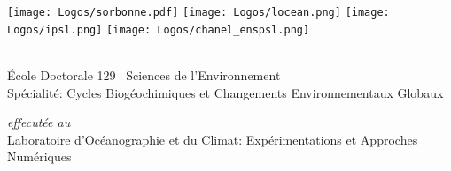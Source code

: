 

\NewDocumentCommand {}

\begin{titlingpage}

\begin{center}
  \def\logosheight{3.2em}
  \texttt{[image: Logos/sorbonne.pdf]}
  \hfill
  \texttt{[image: Logos/locean.png]}
  \hfill
  \texttt{[image: Logos/ipsl.png]}
  \hfill
  \texttt{[image: Logos/chanel\_enspsl.png]}

  \vspace{3.5ex}

  \\
  \vspace{3ex}
  {\normalsize École Doctorale 129 \textendash\ Sciences de l'Environnement\\
  Spécialité: Cycles Biogéochimiques et Changements Environnementaux Globaux}

  \vspace{2ex}

  {\small\textit{effecutée au}}\\
  {\normalsize Laboratoire d'Océanographie et du Climat: Expérimentations et Approches Numériques}


  \parbox{0.9\textwidth}{
    {
      \centering\parskip=0pt
      \xhrulefill[thickness=2pt, height=-0.6ex]\par
      \anysize{19pt}{\linespread{1.5}\bfseries\Title\\
      \strut\xhrulefill[thickness=2pt, height=0.5ex]}
    }
  }



\end{center}


\end{titlingpage}
